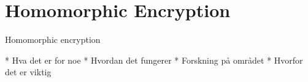 \chapter{Homomorphic Encryption}
\label{chp:he}

Homomorphic encryption


* Hva det er for noe
* Hvordan det fungerer
* Forskning på området
* Hvorfor det er viktig
